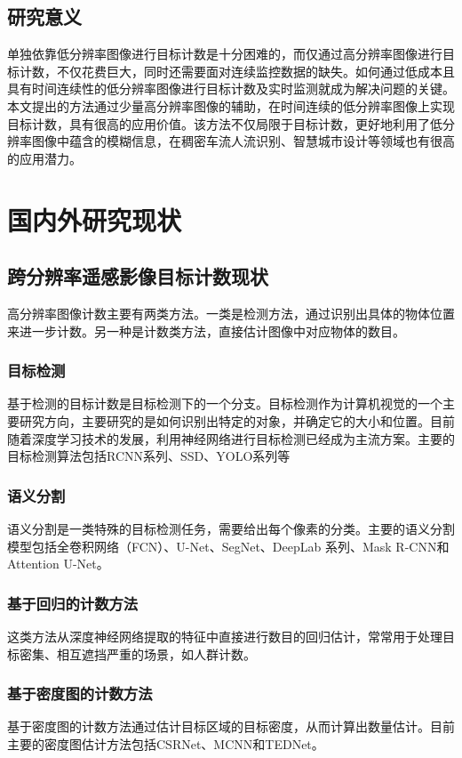 \subsection{研究意义}
单独依靠低分辨率图像进行目标计数是十分困难的，而仅通过高分辨率图像进行目标计数，不仅花费巨大，同时还需要面对连续监控数据的缺失。如何通过低成本且具有时间连续性的低分辨率图像进行目标计数及实时监测就成为解决问题的关键。本文提出的方法通过少量高分辨率图像的辅助，在时间连续的低分辨率图像上实现目标计数，具有很高的应用价值。该方法不仅局限于目标计数，更好地利用了低分辨率图像中蕴含的模糊信息，在稠密车流人流识别、智慧城市设计等领域也有很高的应用潜力。

\section{国内外研究现状}
\subsection{跨分辨率遥感影像目标计数现状}
高分辨率图像计数主要有两类方法。一类是检测方法，通过识别出具体的物体位置来进一步计数。另一种是计数类方法，直接估计图像中对应物体的数目。
\subsubsection{目标检测}
基于检测的目标计数是目标检测下的一个分支。目标检测作为计算机视觉的一个主要研究方向，主要研究的是如何识别出特定的对象，并确定它的大小和位置。目前随着深度学习技术的发展，利用神经网络进行目标检测已经成为主流方案。主要的目标检测算法包括RCNN系列、SSD、YOLO系列等
\subsubsection{语义分割}
语义分割是一类特殊的目标检测任务，需要给出每个像素的分类。主要的语义分割模型包括全卷积网络（FCN）、U-Net、SegNet、DeepLab 系列、Mask R-CNN和Attention U-Net。
\subsubsection{基于回归的计数方法}
这类方法从深度神经网络提取的特征中直接进行数目的回归估计，常常用于处理目标密集、相互遮挡严重的场景，如人群计数。
\subsubsection{基于密度图的计数方法}
基于密度图的计数方法通过估计目标区域的目标密度，从而计算出数量估计。目前主要的密度图估计方法包括CSRNet、MCNN和TEDNet。
